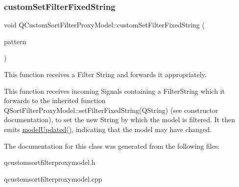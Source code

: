 \subsubsection{\texorpdfstring{custom\+Set\+Filter\+Fixed\+String}{customSetFilterFixedString}}
{\footnotesize\ttfamily void Q\+Custom\+Sort\+Filter\+Proxy\+Model\+::custom\+Set\+Filter\+Fixed\+String (\begin{DoxyParamCaption}\item[{Q\+String}]{pattern }\end{DoxyParamCaption})\hspace{0.3cm}{\ttfamily [slot]}}



This function receives a Filter String and forwards it appropriately. 

This function receives incoming Signals containing a Filter\+String which it forwards to the inherited function Q\+Sort\+Filter\+Proxy\+Model\+::set\+Filter\+Fixed\+String(\+Q\+String) (see constructor documentation), to set the new String by which the model is filtered. It then emits \mbox{\hyperlink{class_q_custom_sort_filter_proxy_model_a5032cbe24943fa9956d35148a65d0c89}{model\+Updated()}}, indicating that the model may have changed. 

The documentation for this class was generated from the following files\+:\begin{DoxyCompactItemize}
\item 
qcustomsortfilterproxymodel.\+h\item 
qcustomsortfilterproxymodel.\+cpp\end{DoxyCompactItemize}
